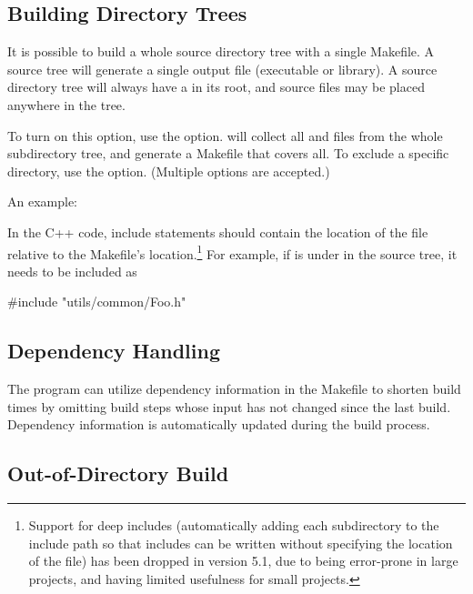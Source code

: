 \subsection{Building Directory Trees}
\label{sec:build-sim-progs:building-directory-trees}

It is possible to build a whole source directory tree with a single Makefile.
A source tree will generate a single output file (executable or library).
A source directory tree will always have a  in its root,
and source files may be placed anywhere in the tree.

To turn on this option, use the  option.
 will collect all  and  files from
the whole subdirectory tree, and generate a Makefile that covers all.
To exclude a specific directory, use the 
option. (Multiple  options are accepted.)

An example:


In the C++ code, include statements should contain the location of the file
relative to the Makefile's location.\footnote{
  Support for deep includes (automatically adding each subdirectory
  to the include path so that includes can be written without specifying
  the location of the file) has been dropped in {\opp} version 5.1, due to
  being error-prone in large projects, and having limited usefulness for
  small projects.}
For example, if  is under  in the source
tree, it needs to be included as

\begin{cpp}
#include "utils/common/Foo.h"
\end{cpp}


\subsection{Dependency Handling}
\label{sec:build-sim-progs:dependency-handling}

The  program can utilize dependency information in the Makefile
to shorten build times by omitting build steps whose input has not changed
since the last build. Dependency information is automatically updated
during the build process.


\subsection{Out-of-Directory Build}
\label{sec:build-sim-progs:out-of-directory-build}

